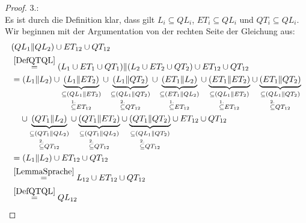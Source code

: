 \begin{proof}
  3.:\\
  Es ist durch die Definition klar, dass gilt $L_i\subseteq QL_i$,
  $ET_i\subseteq QL_i$ und $QT_i\subseteq QL_i$. Wir beginnen mit der
  Argumentation von der rechten Seite der Gleichung aus:
  \begin{align*}
    &(QL_1\| QL_2)\cup ET_{12}\cup QT_{12}\\
    &\overset{\ref{DefQTQL}}{=}(L_1\cup ET_1\cup QT_1)\|(L_2\cup ET_2\cup
    QT_2)\cup ET_{12}\cup QT_{12}\\
    &=(L_1\|L_2)\cup
    \underset{\overset{1.}{\subseteq} ET_{12}}{\underset{\subseteq
    (QL_1\|ET_2)}{\underbrace{(L_1\|ET_2)}}} \cup
    \underset{\overset{2.}{\subseteq} QT_{12}}{\underset{\subseteq
    (QL_1\|QT_2)}{\underbrace{(L_1\|QT_2)}}} \cup
    \underset{\overset{1.}{\subseteq} ET_{12}}{\underset{\subseteq
    (ET_1\|QL_2)}{\underbrace{(ET_1\|L_2)}}} \cup
    \underset{\overset{1.}{\subseteq} ET_{12}}{\underset{\subseteq
    (QL_1\|ET_2)}{\underbrace{(ET_1\|ET_2)}}} \cup
    \underset{\overset{2.}{\subseteq} QT_{12}}{\underset{\subseteq
    (QL_1\|QT_2)}{\underbrace{(ET_1\|QT_2)}}}\\
    &\phantom{=}\;\cup\underset{\overset{2.}{\subseteq} QT_{12}}{\underset{\subseteq
    (QT_1\|QL_2)}{\underbrace{(QT_1\|L_2)}}} \cup
    \underset{\overset{2.}{\subseteq} QT_{12}}{\underset{\subseteq
    (QT_1\|QL_2)}{\underbrace{(QT_1\|ET_2)}}} \cup
    \underset{\overset{2.}{\subseteq} QT_{12}}{\underset{\subseteq
    (QL_1\|QT_2)}{\underbrace{(QT_1\|QT_2)}}} \cup
    ET_{12} \cup QT_{12}\\
    &=(L_1\|L_2) \cup ET_{12} \cup QT_{12}\\
    &\overset{\ref{LemmaSprache}}{=}L_{12}\cup ET_{12}\cup QT_{12}\\
    &\overset{\ref{DefQTQL}}{=}QL_{12}
  \end{align*}
\end{proof}
